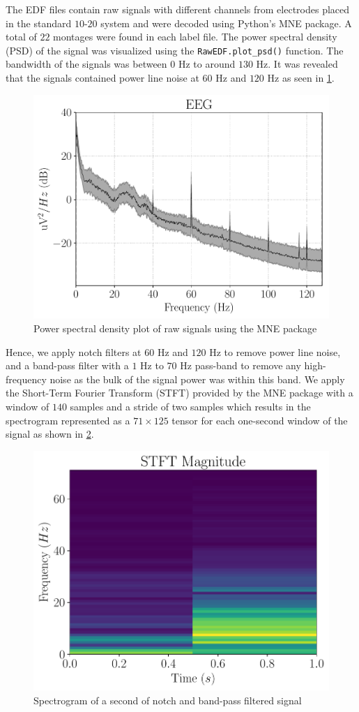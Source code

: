 The EDF files contain raw signals with different channels from electrodes placed in the standard $10$-$20$ system and were decoded using Python's MNE package. A total of $22$ montages were found in each label file. The power spectral density (PSD) of the signal was visualized using the \verb+RawEDF.plot_psd()+ function. The bandwidth of the signals was between $0$ Hz to around $130$ Hz. It was revealed that the signals contained power line noise at $60$ Hz and $120$ Hz as seen in \cref{fig:psd}. 

\begin{figure}[!ht]
	\centering
	\includegraphics[width=0.7\linewidth]{pictures/psd.pdf}
	\caption[Power Spectral Density Plot of Raw Signals]{Power spectral density plot of raw signals using the MNE package}\label{fig:psd}  
\end{figure}

Hence, we apply notch filters at $60$ Hz and $120$ Hz to remove power line noise, and a band-pass filter with a $1$ Hz to $70$ Hz pass-band to remove any high-frequency noise as the bulk of the signal power was within this band. We apply the Short-Term Fourier Transform (STFT) provided by the MNE package with a window of $140$ samples and a stride of two samples which results in the spectrogram represented as a $71 \times 125$ tensor for each one-second window of the signal as shown in \cref{fig:stft}. 

\begin{figure}[!ht]
	\centering
	\includegraphics[width=0.65\linewidth]{pictures/plot21.pdf}
	\caption[Example of Spectrogram]{Spectrogram of a second of notch and band-pass filtered signal}\label{fig:stft}  
\end{figure}


